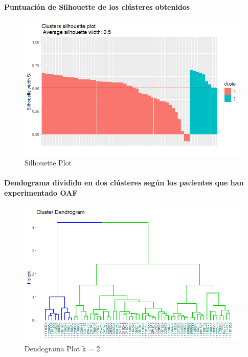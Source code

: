 \paragraph{Puntuación de Silhouette de los clústeres obtenidos}

\begin{figure}[H]
    \centering
    \includegraphics[scale = 0.8]{img/06-3-ccf.png}
    \caption{Silhouette Plot}
    \label{fig:ccf_si}
\end{figure}

\paragraph{Dendograma dividido en dos clústeres según los pacientes que han experimentado OAF}

\begin{figure}[H]
    \centering
    \includegraphics[scale = 0.8]{img/06-4-ccf.png}
    \caption{Dendograma Plot k = 2}
    \label{fig:ccf_ctg}
\end{figure}

